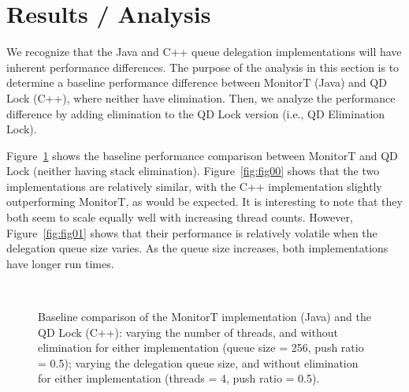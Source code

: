 \section{Results / Analysis}
We recognize that the Java and C++ queue delegation implementations will have inherent performance differences. The purpose of the analysis in this section is to determine a baseline performance difference between MonitorT (Java) and QD Lock (C++), where neither have elimination. Then, we analyze the performance difference by adding elimination to the QD Lock version (i.e., QD Elimination Lock).

Figure~\ref{fig:baseline} shows the baseline performance comparison between MonitorT and QD Lock (neither having stack elimination). Figure~\ref{fig:fig00} shows that the two implementations are relatively similar, with the C++ implementation slightly outperforming MonitorT, as would be expected. It is interesting to note that they both seem to scale equally well with increasing thread counts. However, Figure~\ref{fig:fig01} shows that their performance is relatively volatile when the delegation queue size varies. As the queue size increases, both implementations have longer run times.

\begin{figure}[]
\centering
{}
\\
\caption[]{Baseline comparison of the MonitorT implementation (Java) and the QD Lock (C++):  varying the number of threads, and without elimination for either implementation (queue size = 256, push ratio = 0.5);  varying the delegation queue size, and without elimination for either implementation (threads = 4, push ratio = 0.5).}
\label{fig:baseline}
\end{figure}

